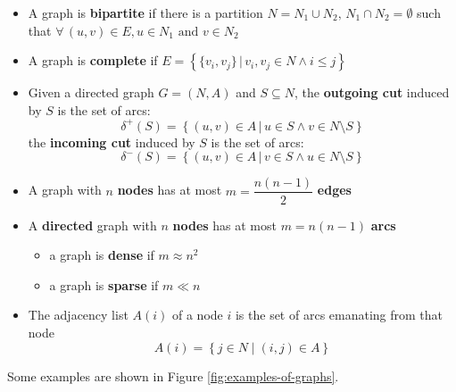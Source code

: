 \documentclass[english]{article}
\begin{document}
\begin{itemize}
  \item A graph is \textbf{bipartite} if there is a partition \(N = N_1 \cup N_2, \, N_1 \cap N_2 = \emptyset\) such that \(\forall \, (u, v) \in E, u \in N_1 \text{ and } v \in N_2\)
  \item A graph is \textbf{complete} if \(E = \left\{\{v_i, v_j\} \,|\, v_i, v_j \in N \land i \leq j \right\}\)
  \item Given a directed graph \(G = (N, A)\) and \(S \subseteq N\), the \textbf{outgoing cut} induced by \(S\) is the set of arcs:
        \[\delta^+(S) = \left\{ (u, v) \in A \,|\, u \in S \land v \in N \setminus S \right\}\]
        the \textbf{incoming cut} induced by \(S\) is the set of arcs:
        \[\delta^-(S) = \left\{ (u, v) \in A \,|\, v \in S \land u \in N \setminus S \right\}\]
  \item A graph with \(n\) \textbf{nodes} has at most \(m = \dfrac{n(n-1)}{2}\) \textbf{edges}
  \item A \textbf{directed} graph with \(n\) \textbf{nodes} has at most \(m = n(n-1)\) \textbf{arcs}
        \begin{itemize}
          \item a graph is \textbf{dense} if \(m \approx n^2\)
          \item a graph is \textbf{sparse} if \(m \ll n\)
        \end{itemize}
  \item The adjacency list \(A(i)\) of a node \(i\) is the set of arcs emanating from that node
        \[ A(i) = \left\{ j \in N \mid   (i, j) \in A  \right\} \]
\end{itemize}

\bigskip
Some examples are shown in Figure \ref{fig:examples-of-graphs}.
\end{document}
